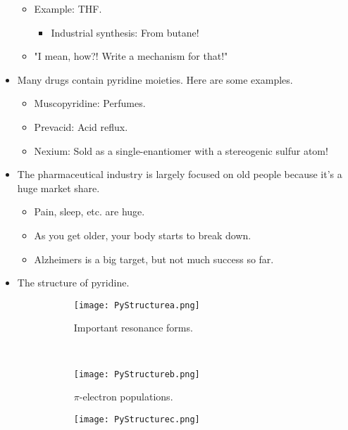 \documentclass[../notes.tex]{subfiles}
\begin{document}
\begin{itemize}
\begin{itemize}
\begin{itemize}
        \end{itemize}
        \item Example: THF.
        \begin{itemize}
            \item Industrial synthesis: From butane!
        \end{itemize}
        \item "I mean, how?! Write a mechanism for that!"
    \end{itemize}
    \item Many drugs contain pyridine moieties. Here are some examples.
    \begin{itemize}
        \item Muscopyridine: Perfumes.
        \item Prevacid: Acid reflux.
        \item Nexium: Sold as a single-enantiomer with a stereogenic sulfur atom!
    \end{itemize}
    \item The pharmaceutical industry is largely focused on old people because it's a huge market share.
    \begin{itemize}
        \item Pain, sleep, etc. are huge.
        \item As you get older, your body starts to break down.
        \item Alzheimers is a big target, but not much success so far.
    \end{itemize}
    \item The structure of pyridine.
    \begin{figure}[H]
        \centering
        \begin{subfigure}[b]{\linewidth}
            \centering
            \texttt{[image: PyStructurea.png]}
            \caption{Important resonance forms.}
            \label{fig:PyStructurea}
        \end{subfigure}\\[1em]
        \begin{subfigure}[b]{0.3\linewidth}
            \centering
            \texttt{[image: PyStructureb.png]}
            \caption{$\pi$-electron populations.}
            \label{fig:PyStructureb}
        \end{subfigure}
        \begin{subfigure}[b]{0.3\linewidth}
            \centering
            \texttt{[image: PyStructurec.png]}

\end{subfigure}
\end{figure}
\end{itemize}
\end{document}
